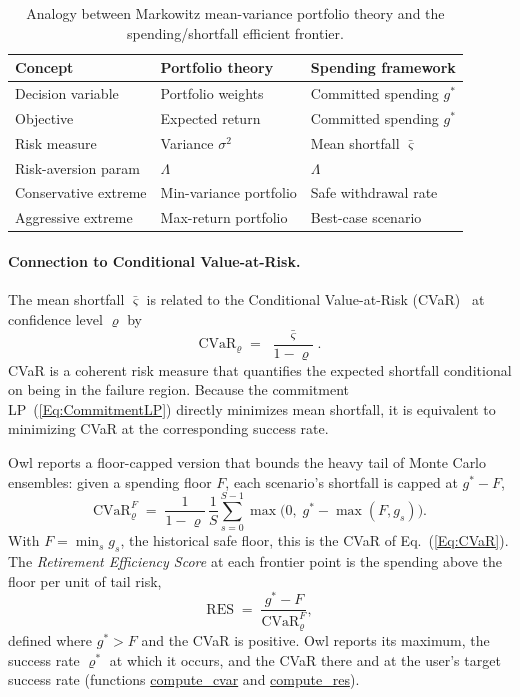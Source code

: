 \documentclass[fleqn,12pt]{report}
\newcommand{\code}[1]{\url{#1}}
\begin{document}
\begin{table}[ht]
\centering
\begin{tabular}{lll}
\hline
\textbf{Concept} & \textbf{Portfolio theory} & \textbf{Spending framework} \\
\hline
Decision variable   & Portfolio weights           & Committed spending $g^*$     \\
Objective           & Expected return             & Committed spending $g^*$     \\
Risk measure        & Variance $\sigma^2$         & Mean shortfall $\bar\varsigma$  \\
Risk-aversion param & $\Lambda$                   & $\Lambda$                    \\
Conservative extreme & Min-variance portfolio     & Safe withdrawal rate         \\
Aggressive extreme  & Max-return portfolio        & Best-case scenario           \\
\hline
\end{tabular}
\caption{Analogy between Markowitz mean-variance portfolio theory and the
         spending/shortfall efficient frontier.}
\label{Tab:Markowitz}
\end{table}

\paragraph*{Connection to Conditional Value-at-Risk.}
The mean shortfall $\bar\varsigma$ is related to the
Conditional Value-at-Risk (CVaR)~\cite{artzner1999,rockafellar2000} at
confidence level $\varrho$ by
\begin{equation}
    \label{Eq:CVaR}
    \mathrm{CVaR}_\varrho \;=\; \frac{\bar\varsigma}{1 - \varrho}.
\end{equation}
CVaR is a coherent risk measure that quantifies the expected shortfall
conditional on being in the failure region.
Because the commitment LP~(\ref{Eq:CommitmentLP}) directly minimizes mean shortfall,
it is equivalent to minimizing CVaR at the corresponding success rate.

Owl reports a floor-capped version that bounds the heavy tail of Monte Carlo ensembles:
given a spending floor $F$, each scenario's shortfall is capped at $g^* - F$,
\begin{equation}
    \label{Eq:CVaRFloor}
    \mathrm{CVaR}^{F}_\varrho \;=\; \frac{1}{1 - \varrho}\,\frac{1}{S}
    \sum_{s=0}^{S-1} \max\bigl(0,\; g^* - \max(F, g_s)\bigr).
\end{equation}
With $F = \min_s g_s$, the historical safe floor, this is the CVaR of
Eq.~(\ref{Eq:CVaR}).
The \textit{Retirement Efficiency Score} at each frontier point is the spending above the
floor per unit of tail risk,
\begin{equation}
    \label{Eq:RES}
    \mathrm{RES} \;=\; \frac{g^* - F}{\mathrm{CVaR}^{F}_\varrho},
\end{equation}
defined where $g^* > F$ and the CVaR is positive.
Owl reports its maximum, the success rate $\varrho^*$ at which it occurs, and the CVaR there
and at the user's target success rate (functions \code{compute_cvar} and \code{compute_res}).
\end{document}
